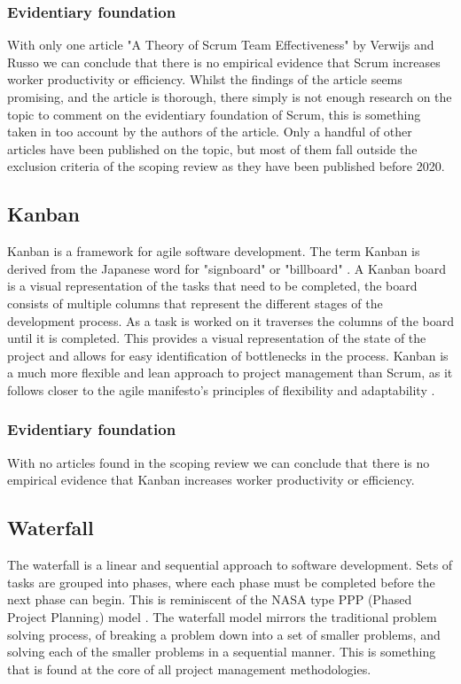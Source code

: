 \documentclass[12pt]{article}
\begin{document}
\subsubsection{Evidentiary foundation}
With only one article "A Theory of Scrum Team Effectiveness" by Verwijs and Russo \cite{verwijsTheoryScrumTeam2023} we can conclude that there
is no empirical evidence that Scrum increases worker productivity or efficiency. Whilst the findings of the article seems promising, and the article is thorough, there simply is not 
enough research on the topic to comment on the evidentiary foundation of Scrum, this is something taken in too account by the authors of the article. 
Only a handful of other articles have been published on the topic, but most of them fall outside the exclusion criteria of the scoping review as they
have been published before 2020.

\subsection{Kanban}
Kanban is a framework for agile software development. The term Kanban is derived from the Japanese word for "signboard" or "billboard" \cite{KanbanDevelopment2025}.
A Kanban board is a visual representation of the tasks that need to be completed, the board consists of multiple columns that represent the 
different stages of the development process. As a task is worked on it traverses the columns of the board until it is completed.
This provides a visual representation of the state of the project and allows for easy identification of bottlenecks in the process.
Kanban is a much more flexible and lean approach to project management than Scrum, as it follows closer to the agile manifesto's principles 
of flexibility and adaptability \cite{ManifestoAgileSoftware}.

\subsubsection{Evidentiary foundation}
With no articles found in the scoping review we can conclude that there is no empirical evidence that Kanban increases worker productivity or efficiency.

\subsection{Waterfall}
The waterfall \cite{WaterfallModel2025} is a linear and sequential approach to software development. Sets of tasks are grouped into phases, 
where each phase must be completed before the next phase can begin. This is reminiscent of the NASA type PPP 
(Phased Project Planning) model \cite{PhasedProjectPlanning1968}.
The waterfall model mirrors the traditional problem solving process, of breaking a problem down into a set of smaller problems,
and solving each of the smaller problems in a sequential manner. This is something that is found at the core 
of all project management methodologies.
\end{document}
